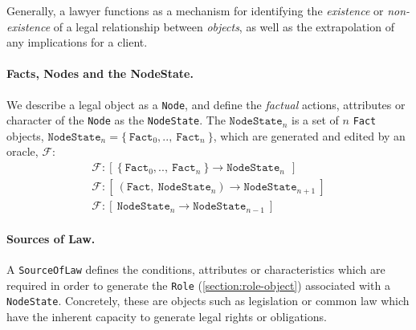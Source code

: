 \documentclass{article}
\numberwithin{equation}{section}
\begin{document}
Generally, a lawyer functions as a mechanism for identifying the \textit{existence} or \textit{non-existence} of a legal relationship between \textit{objects}, as well as the extrapolation of any implications for a client. 


\paragraph{Facts, Nodes and the NodeState.} We describe a legal object as a \texttt{Node}, and define the \textit{factual} actions, attributes or character of the \texttt{Node} as the \texttt{NodeState}. The $\texttt{NodeState}_n$ is a set of $n$ \texttt{Fact} objects, $\texttt{NodeState}_n = \{ \ \texttt{Fact}_0, .., \ \texttt{Fact}_n \ \}$, which are generated and edited by an oracle, $\mathcal{F}$:
\begin{align}
	\mathcal{F}: [ \ \{ \ \texttt{Fact}_0, .., \ \texttt{Fact}_n \ \} \rightarrow \texttt{NodeState}_n \ \ ] \\
	\mathcal{F}: [ \ (\texttt{Fact}, \ \texttt{NodeState}_n) \rightarrow \texttt{NodeState}_{n+1} \ ] \\
	\mathcal{F}: [ \ \texttt{NodeState}_n \rightarrow \texttt{NodeState}_{n-1} \ ]
\end{align}

\paragraph{Sources of Law.} A \texttt{SourceOfLaw} defines the conditions, attributes or characteristics which are required in order to generate the \texttt{Role} (\ref{section:role-object})  associated with a \texttt{NodeState}. Concretely, these are objects such as legislation or common law which have the inherent capacity to generate legal rights or obligations.
\end{document}
